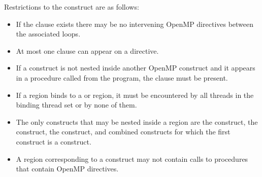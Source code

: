 
\restrictions
Restrictions to the  construct are as follows:

\begin{itemize}
  \item If the  clause exists there may be no intervening OpenMP
    directives between the associated loops.



  \item At most one  clause can appear on a  directive.

  \item If a  construct is not nested inside another OpenMP
      construct and it appears in a procedure called from the program, the
       clause must be present.

  \item If a  region binds to a  or 
      region, it must be encountered by all threads in the binding thread set
      or by none of them.

  \item The only constructs that may be nested inside a  region
    are the  construct, the  construct, the
     construct, and combined constructs for which the first
    construct is a  construct.


  \item A  region corresponding to a  construct may not
    contain calls to procedures that contain OpenMP directives. 


\end{itemize}
